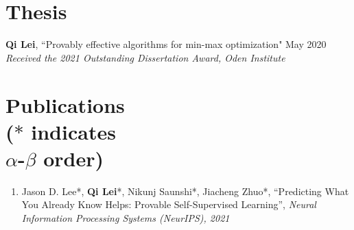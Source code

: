 \documentclass[margin, 10pt]{res} %
\begin{document}
\begin{resume}
\begin{itemize}[noitemsep]
\end{itemize}








\section{Thesis} 
\textbf{Qi Lei}, ``Provably effective algorithms for min-max optimization" \hfill{May 2020} \\ 
\textit{Received the 2021 Outstanding Dissertation Award, Oden Institute}


\section{Publications\\
	\vspace{4pt}
{\footnotesize ($*$ indicates\\ $\alpha$-$\beta$ order) }}
\begin{enumerate}
		\item {Jason D. Lee*, \textbf{Qi Lei}*, Nikunj Saunshi*, Jiacheng Zhuo*, ``Predicting What You Already Know Helps: Provable Self-Supervised Learning”, \textit{Neural Information Processing Systems (NeurIPS), 2021}}



\end{enumerate}
\end{resume}
\end{document}
